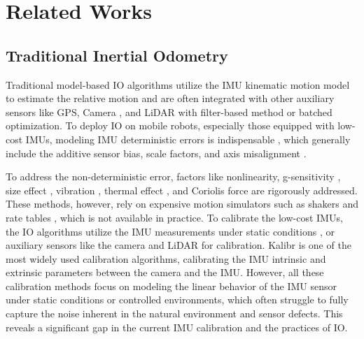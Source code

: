 \section{Related Works}

\subsection{Traditional Inertial Odometry}
\label{sec: imu-denoise}
Traditional model-based IO algorithms utilize the IMU kinematic motion model \cite{forster2015imu} to estimate the relative motion and are often integrated with other auxiliary sensors like GPS, Camera \cite{qin2018vins}, and LiDAR \cite{hemann2016long} with filter-based method or batched optimization.
To deploy IO on mobile robots, especially those equipped with low-cost IMUs, modeling IMU deterministic errors is indispensable \cite{barshan1995inertial}, which generally include the additive sensor bias, scale factors, and axis misalignment \cite{rehder2017camera}. 

To address the non-deterministic error, factors like nonlinearity, g-sensitivity \cite{Krebs2012}, size effect \cite{hung1979size}, vibration \cite{capriglione2020experimental}, thermal effect \cite{niu2013fast}, and Coriolis force \cite{brossard2021associating} are rigorously addressed.
These methods, however, rely on expensive motion simulators such as shakers and rate tables \cite{qureshi2017algorithm}, which is not available in practice.
To calibrate the low-cost IMUs, the IO algorithms utilize the IMU measurements under static conditions \cite{tedaldi2014robust, barshan1995inertial}, or auxiliary sensors like the camera \cite{rehder2016extending, yang2023online} and LiDAR \cite{lv2020targetless} for calibration.
Kalibr \cite{rehder2016extending} is one of the most widely used calibration algorithms, calibrating the IMU intrinsic and extrinsic parameters between the camera and the IMU.
However, all these calibration methods focus on modeling the linear behavior of the IMU sensor under static conditions or controlled environments, which often struggle to fully capture the noise inherent in the natural environment and sensor defects.
This reveals a significant gap in the current IMU calibration and the practices of IO.

